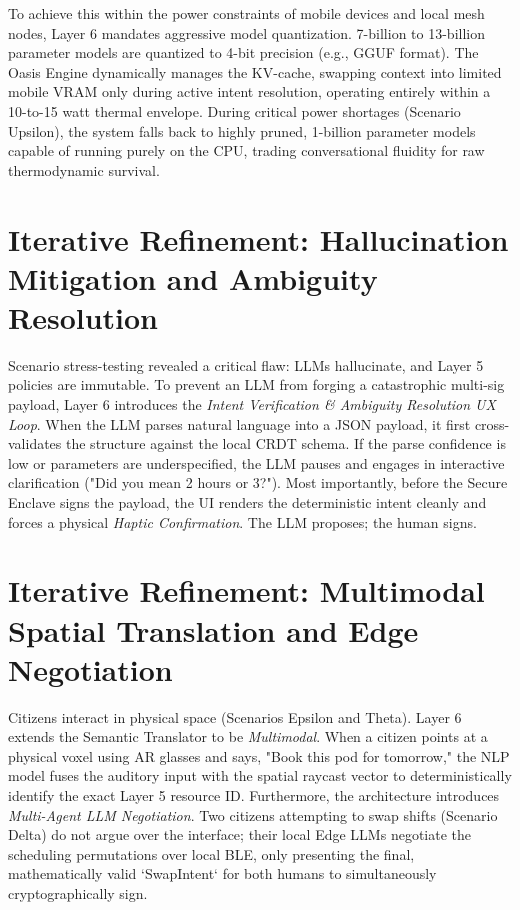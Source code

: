 To achieve this within the power constraints of mobile devices and local mesh nodes, Layer 6 mandates aggressive model quantization. 7-billion to 13-billion parameter models are quantized to 4-bit precision (e.g., GGUF format). The Oasis Engine dynamically manages the KV-cache, swapping context into limited mobile VRAM only during active intent resolution, operating entirely within a 10-to-15 watt thermal envelope. During critical power shortages (Scenario Upsilon), the system falls back to highly pruned, 1-billion parameter models capable of running purely on the CPU, trading conversational fluidity for raw thermodynamic survival.

\section{Iterative Refinement: Hallucination Mitigation and Ambiguity Resolution}
Scenario stress-testing revealed a critical flaw: LLMs hallucinate, and Layer 5 policies are immutable. To prevent an LLM from forging a catastrophic multi-sig payload, Layer 6 introduces the \textit{Intent Verification \& Ambiguity Resolution UX Loop}. When the LLM parses natural language into a JSON payload, it first cross-validates the structure against the local CRDT schema. If the parse confidence is low or parameters are underspecified, the LLM pauses and engages in interactive clarification ("Did you mean 2 hours or 3?"). Most importantly, before the Secure Enclave signs the payload, the UI renders the deterministic intent cleanly and forces a physical \textit{Haptic Confirmation}. The LLM proposes; the human signs.

\section{Iterative Refinement: Multimodal Spatial Translation and Edge Negotiation}
Citizens interact in physical space (Scenarios Epsilon and Theta). Layer 6 extends the Semantic Translator to be \textit{Multimodal}. When a citizen points at a physical voxel using AR glasses and says, "Book this pod for tomorrow," the NLP model fuses the auditory input with the spatial raycast vector to deterministically identify the exact Layer 5 resource ID. Furthermore, the architecture introduces \textit{Multi-Agent LLM Negotiation}. Two citizens attempting to swap shifts (Scenario Delta) do not argue over the interface; their local Edge LLMs negotiate the scheduling permutations over local BLE, only presenting the final, mathematically valid `SwapIntent` for both humans to simultaneously cryptographically sign.
